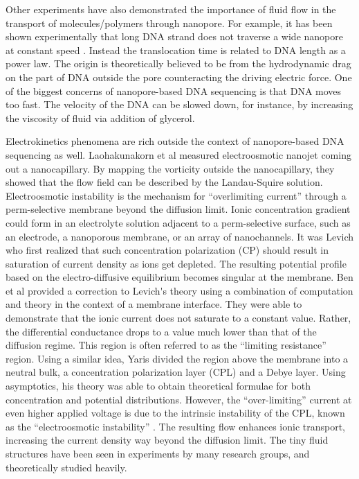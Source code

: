 Other experiments have also demonstrated the importance of fluid flow in the transport of molecules\//polymers through nanopore. For example, it has been shown experimentally that long DNA strand does not traverse a wide nanopore at constant speed \cite{storm_nanolett05}. Instead the translocation time is related to DNA length as a power law. The origin is theoretically believed to be from the hydrodynamic drag on the part of DNA outside the pore counteracting the driving electric force. One of the biggest concerns of nanopore-based DNA sequencing is that DNA moves too fast. The velocity of the DNA can be slowed down, for instance, by increasing the viscosity of fluid via addition of glycerol\cite{fologea2005slowing}. 

Electrokinetics phenomena are rich outside the context of nanopore-based DNA sequencing as well. Laohakunakorn et al\cite{ghosal2013Nanoletter} measured electroosmotic nanojet coming out a nanocapillary. By mapping the vorticity outside the nanocapillary, they showed that the flow field can be described by the Landau-Squire solution. Electroosmotic instability is the mechanism for ``overlimiting current'' through a perm-selective membrane beyond the diffusion limit. Ionic concentration gradient could form in an electrolyte solution adjacent to a perm-selective surface, such as an electrode, a nanoporous membrane, or an array of nanochannels\cite{Vlassiouk2008a}. It was Levich \cite{Levich} who first realized that such concentration polarization (CP) should result in saturation of current density as ions get depleted. The resulting potential profile based on the electro-diffusive equilibrium becomes singular at the membrane. Ben et al \cite{Ben2002} provided a correction to Levich\'{}s theory using a combination of computation and theory in the context of a membrane interface. They were able to demonstrate that the ionic current does not saturate to a constant value. Rather, the differential conductance drops to a value much lower than that of the diffusion regime. This region is often referred to as the ``limiting resistance'' region. Using a similar idea, Yaris \cite{Yariv2009} divided the region above the membrane into a neutral bulk, a concentration polarization layer (CPL) and a Debye layer. Using asymptotics, his theory was able to obtain theoretical formulae for both concentration and potential distributions. However, the ``over-limiting'' current at even higher applied voltage is due to the intrinsic instability of the CPL, known as the ``electroosmotic instability'' \cite{Rubinstein1979,rubinstein2005electroconvective,ZALTZMAN2007}. The resulting flow enhances ionic transport, increasing the current density way beyond the diffusion limit. The tiny fluid structures have been seen in experiments by many research groups, and theoretically studied heavily\cite{rubinstein2000electro,rubinstein2008direct,dydek2011overlimiting,deng2013overlimiting,chinaryan2014effect,Yossifon2008,yossifon2009nonlinear,Chang2011,kim2007concentration}. 


